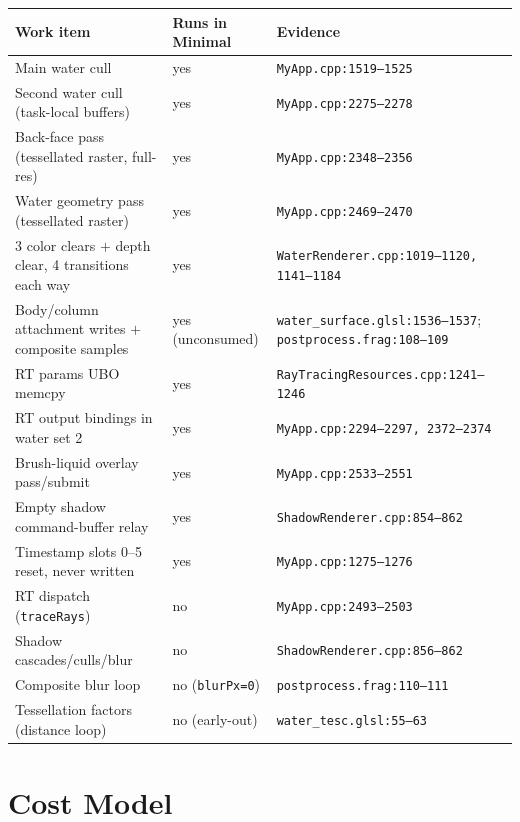 \documentclass[11pt,a4paper]{article}
\begin{document}
\begin{longtable}{@{}p{6.4cm}p{2.4cm}p{5.2cm}@{}}
\toprule
\textbf{Work item} & \textbf{Runs in Minimal} & \textbf{Evidence} \\
\midrule
\endhead
Main water cull & yes & \texttt{MyApp.cpp:1519--1525} \\
Second water cull (task-local buffers) & yes & \texttt{MyApp.cpp:2275--2278} \\
Back-face pass (tessellated raster, full-res) & yes & \texttt{MyApp.cpp:2348--2356} \\
Water geometry pass (tessellated raster) & yes & \texttt{MyApp.cpp:2469--2470} \\
3 color clears $+$ depth clear, 4 transitions each way & yes & \texttt{WaterRenderer.cpp:1019--1120, 1141--1184} \\
Body/column attachment writes $+$ composite samples & yes (unconsumed) & \texttt{water\_surface.glsl:1536--1537}; \texttt{postprocess.frag:108--109} \\
RT params UBO memcpy & yes & \texttt{RayTracingResources.cpp:1241--1246} \\
RT output bindings in water set 2 & yes & \texttt{MyApp.cpp:2294--2297, 2372--2374} \\
Brush-liquid overlay pass/submit & yes & \texttt{MyApp.cpp:2533--2551} \\
Empty shadow command-buffer relay & yes & \texttt{ShadowRenderer.cpp:854--862} \\
Timestamp slots 0--5 reset, never written & yes & \texttt{MyApp.cpp:1275--1276} \\
RT dispatch (\texttt{traceRays}) & no & \texttt{MyApp.cpp:2493--2503} \\
Shadow cascades/culls/blur & no & \texttt{ShadowRenderer.cpp:856--862} \\
Composite blur loop & no (\texttt{blurPx=0}) & \texttt{postprocess.frag:110--111} \\
Tessellation factors (distance loop) & no (early-out) & \texttt{water\_tesc.glsl:55--63} \\
\bottomrule
\end{longtable}

\section{Cost Model}
\end{document}
